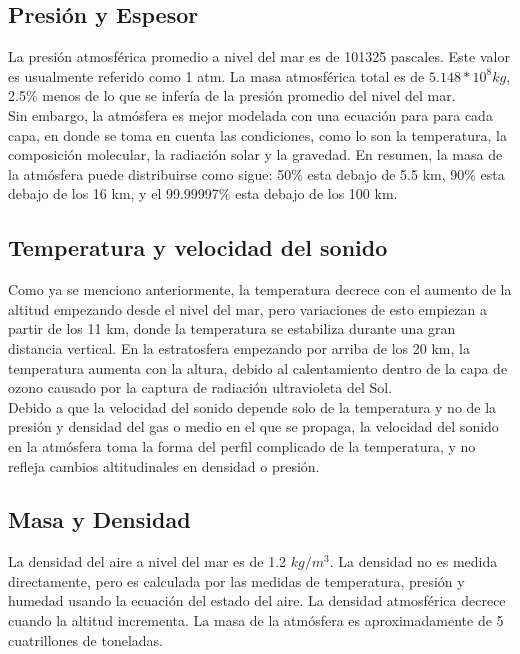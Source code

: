 \documentclass{article} %
\begin{document}
\subsection{Presión y Espesor}
La presión atmosférica promedio a nivel del mar es de 101325 pascales. Este valor es usualmente referido como 1 atm. La masa atmosférica total es de $5.148 * 10^8  kg$, 2.5\% menos de lo que se infería   de la presión promedio del nivel del mar.\\

Sin embargo, la atmósfera es mejor modelada con una ecuación para para cada capa, en donde se toma en cuenta las condiciones, como lo son la temperatura, la composición molecular, la radiación solar y la gravedad. En resumen, la masa de la atmósfera puede distribuirse como sigue: 50\% esta debajo de 5.5 km, 90\% esta debajo de los 16 km, y el 99.99997\% esta debajo de los 100 km.

\subsection{Temperatura y velocidad del sonido}
Como ya se menciono anteriormente, la temperatura decrece con el aumento de la altitud empezando desde el nivel del mar, pero variaciones de esto empiezan a partir de los 11 km, donde la temperatura se estabiliza durante una gran distancia vertical. En la estratosfera empezando por arriba de los 20 km, la temperatura aumenta con la altura, debido al calentamiento dentro de la capa de ozono causado por la captura de radiación ultravioleta del Sol.\\

Debido a que la velocidad del sonido depende solo de la temperatura y no de la presión y densidad del gas o medio en el que se propaga, la velocidad del sonido en la atmósfera toma la forma del perfil complicado de la temperatura, y no refleja cambios altitudinales en densidad o presión.


\subsection{Masa y Densidad}
La densidad del aire a nivel del mar es de 1.2 $kg/m^3$. La densidad no es medida directamente, pero es calculada por las medidas de temperatura, presión y humedad usando la ecuación del estado del aire. La densidad atmosférica decrece cuando la altitud incrementa. La masa de la atmósfera  es aproximadamente de 5 cuatrillones de toneladas.
\end{document}
